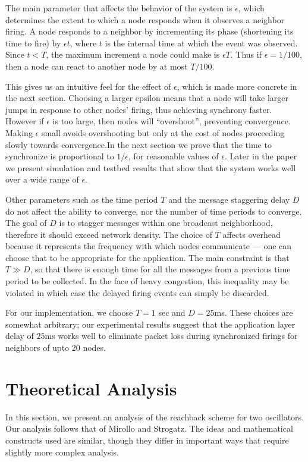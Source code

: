 \documentclass{sig-alternate}
\begin{document}
{The main parameter that affects the behavior of the system is
$\epsilon$, which determines the extent to which a node responds when
it observes a neighbor firing. A node responds to a neighbor by
incrementing its phase (shortening its time to fire) by $\epsilon t$,
where $t$ is the internal time at which the event was observed. Since
$t<T$, the maximum increment a node could make is $\epsilon T$. Thus
if $\epsilon = 1/100$, then a node can react to another node by at
most $T/100$. 

This gives us an intuitive feel for the effect of $\epsilon$, which is
made more concrete in the next section.  Choosing a larger epsilon
means that a node will take larger jumps in response to other nodes'
firing, thus achieving synchrony faster. However if $\epsilon$ is too
large, then nodes will ``overshoot'', preventing convergence. Making
$\epsilon$ small avoids overshooting but only at the cost of nodes
proceeding slowly towards convergence.In the next section we prove
that the time to synchronize is proportional to $1/\epsilon$, for
reasonable values of $\epsilon$. Later in the paper we present
simulation and testbed results that show that the system works well
over a wide range of $\epsilon$.


Other parameters such as the time period $T$ and the message
staggering delay $D$ do not affect the ability to converge, nor the
number of time periods to converge. The goal of $D$ is to stagger
messages within one broadcast neighborhood, therefore it should exceed
network density. The choice of $T$ affects overhead because it
represents the frequency with which nodes communicate --- one can
choose that to be appropriate for the application. The main constraint
is that $T \gg D$, so that there is enough time for all the messages
from a previous time period to be collected. In the face of heavy
congestion, this inequality may be violated in which case the delayed
firing events can simply be discarded.

For our implementation, we choose $T=1$ sec and $D=25$ms. These
choices are somewhat arbitrary; our experimental results suggest that
the application layer delay of $25$ms works well to eliminate packet
loss during synchronized firings for neighbors of upto 20 nodes.

\section{Theoretical Analysis}
\label{sec-theory}

In this section, we present an analysis of the reachback scheme for
two oscillators. Our analysis follows that of Mirollo and
Strogatz. The ideas and mathematical constructs used are similar,
though they differ in important ways that require slightly more
complex analysis.

}
\end{document}

